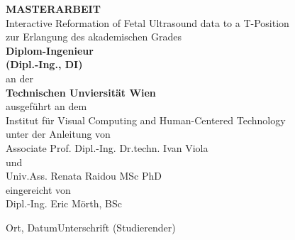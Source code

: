 \begin{titlepage}
\begin{center}  
    \Large{\textbf{\textsf{\MakeUppercase{
        Masterarbeit
    }}}}
    \vspace{15mm}
    \LARGE{\textsf{\\Interactive Reformation of Fetal Ultrasound data to a T-Position\\}}
    \vspace{15mm}
    \normalsize{
    	\textsf{zur Erlangung des akademischen Grades\\}
    	\singlespacing\textbf{Diplom-Ingenieur\\(Dipl.-Ing., DI)\\}
        \vspace{6mm}
        \textsf{an der\\}
        \textbf{Technischen Unviersität Wien\\}
        \vspace{6mm}
        \textsf{ausgeführt an dem\\Institut für Visual Computing and Human-Centered Technology}
        \vspace{6mm}
        \textsf{\\unter der Anleitung von\\Associate Prof. Dipl.-Ing. Dr.techn. Ivan Viola}
        \textsf{\\und\\Univ.Ass. Renata Raidou MSc PhD\\}
        \vspace{6mm}
        \textsf{eingereicht von\\Dipl.-Ing. Eric Mörth, BSc\\}
    }
    \vspace{25mm}
\end{center}
\begin{flushleft}
	\noindent \textsf{Ort, Datum}\hfill\hfill\textsf{Unterschrift (Studierender)} \\ 
    \vspace{5mm}
    \underline{\hspace{4.5cm}}\hfill\hfill\underline{\hspace{4.5cm}}
\end{flushleft}
\end{titlepage}